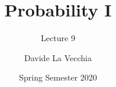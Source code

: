 \documentclass[notes=show,handout]{beamer}
\newenvironment{stepitemize}{\begin{itemize}[<+->]}{\end{itemize} }
\renewcommand{\Pr}{P}
\begin{document}
\title[S110015]{Probability I}
\subtitle{Lecture 9}
\author[La Vecchia]{Davide La Vecchia}
\date{Spring Semester 2020}
\maketitle

%
%
%
%
%
%
%
%
\end{document}
